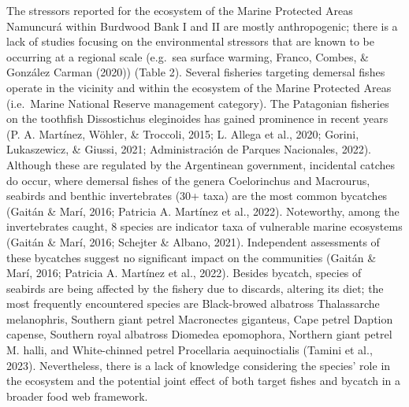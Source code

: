 \documentclass[
]{article}
\begin{document}
The stressors reported for the ecosystem of the Marine Protected Areas
Namuncurá within Burdwood Bank I and II are mostly anthropogenic; there
is a lack of studies focusing on the environmental stressors that are
known to be occurring at a regional scale (e.g.~sea surface warming,
Franco, Combes, \& González Carman (2020)) (Table 2). Several fisheries
targeting demersal fishes operate in the vicinity and within the
ecosystem of the Marine Protected Areas (i.e.~Marine National Reserve
management category). The Patagonian fisheries on the toothfish
Dissostichus eleginoides has gained prominence in recent years (P. A.
Martínez, Wöhler, \& Troccoli, 2015; L. Allega et al., 2020; Gorini,
Lukaszewicz, \& Giussi, 2021; Administración de Parques Nacionales,
2022). Although these are regulated by the Argentinean government,
incidental catches do occur, where demersal fishes of the genera
Coelorinchus and Macrourus, seabirds and benthic invertebrates (30+
taxa) are the most common bycatches (Gaitán \& Marí, 2016; Patricia A.
Martínez et al., 2022). Noteworthy, among the invertebrates caught, 8
species are indicator taxa of vulnerable marine ecosystems (Gaitán \&
Marí, 2016; Schejter \& Albano, 2021). Independent assessments of these
bycatches suggest no significant impact on the communities (Gaitán \&
Marí, 2016; Patricia A. Martínez et al., 2022). Besides bycatch, species
of seabirds are being affected by the fishery due to discards, altering
its diet; the most frequently encountered species are Black-browed
albatross Thalassarche melanophris, Southern giant petrel Macronectes
giganteus, Cape petrel Daption capense, Southern royal albatross
Diomedea epomophora, Northern giant petrel M. halli, and White-chinned
petrel Procellaria aequinoctialis (Tamini et al., 2023). Nevertheless,
there is a lack of knowledge considering the species' role in the
ecosystem and the potential joint effect of both target fishes and
bycatch in a broader food web framework.
\end{document}
